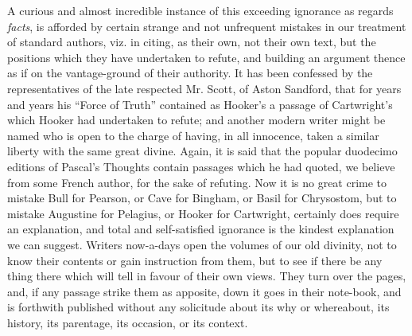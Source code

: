 A curious and almost incredible instance of this
exceeding ignorance as regards \emph{facts}, is afforded by certain
strange and not unfrequent mistakes in our treatment of standard
authors, viz. in citing, as their own, not their own text, but the
positions which they have undertaken to refute, and building an argument
thence as if on the vantage-ground of their authority. It has been
confessed by the representatives of the late respected Mr. Scott, of
Aston Sandford, that for years and years his ``Force of Truth'' contained
as Hooker's a passage of Cartwright's which Hooker had undertaken to
refute; and another modern writer might be named who is open to the
charge of having, in all innocence, taken a similar liberty with the
same great divine. Again, it is said that the popular duodecimo editions
of Pascal's Thoughts contain passages which he had quoted, we believe
from some French author, for the sake of refuting. Now it is no great
crime to mistake Bull for Pearson, or Cave for Bingham, or Basil for
Chrysostom, but to mistake Augustine for Pelagius, or Hooker for
Cartwright, certainly does require an explanation, and total and
self-satisfied ignorance is the kindest explanation we can suggest.
Writers now-a-days open the volumes of our old divinity, not to know
their contents or gain instruction from them, but to see if there be any
thing there which will tell in favour of their own views. They turn over
the pages, and, if any passage strike them as apposite, down it
goes in their note-book, and is forthwith published without any
solicitude about its why or whereabout, its history, its parentage, its
occasion, or its context.

